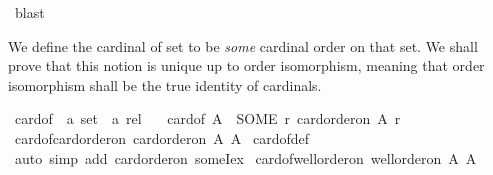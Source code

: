 \begin{isabellebody}
\ blast%
\endisatagproof
{\isafoldproof}%
%
\isadelimproof
%
\endisadelimproof
%
\isadelimdocument
%
\endisadelimdocument
%
\isatagdocument
%
\isamarkuptrue%
%
\endisatagdocument
{\isafolddocument}%
%
\isadelimdocument
%
\endisadelimdocument
%
\begin{isamarkuptext}%
We define the cardinal of set to be {\em some} cardinal order on that set.
We shall prove that this notion is unique up to order isomorphism, meaning
that order isomorphism shall be the true identity of cardinals.%
\end{isamarkuptext}\isamarkuptrue%
\isamarkupfalse%
\ card{\isacharunderscore}{\kern0pt}of\ {\isacharcolon}{\kern0pt}{\isacharcolon}{\kern0pt}\ {\isachardoublequoteopen}{\isacharprime}{\kern0pt}a\ set\ {\isasymRightarrow}\ {\isacharprime}{\kern0pt}a\ rel{\isachardoublequoteclose}\ {\isacharparenleft}{\kern0pt}{\isachardoublequoteopen}{\isacharbar}{\kern0pt}{\isacharunderscore}{\kern0pt}{\isacharbar}{\kern0pt}{\isachardoublequoteclose}\ {\isacharparenright}{\kern0pt}\isanewline
{}\ {\isachardoublequoteopen}card{\isacharunderscore}{\kern0pt}of\ A\ {\isacharequal}{\kern0pt}\ {\isacharparenleft}{\kern0pt}SOME\ r{\isachardot}{\kern0pt}\ card{\isacharunderscore}{\kern0pt}order{\isacharunderscore}{\kern0pt}on\ A\ r{\isacharparenright}{\kern0pt}{\isachardoublequoteclose}\isanewline
\isanewline
{}\isamarkupfalse%
\ card{\isacharunderscore}{\kern0pt}of{\isacharunderscore}{\kern0pt}card{\isacharunderscore}{\kern0pt}order{\isacharunderscore}{\kern0pt}on{\isacharcolon}{\kern0pt}\ {\isachardoublequoteopen}card{\isacharunderscore}{\kern0pt}order{\isacharunderscore}{\kern0pt}on\ A\ {\isacharbar}{\kern0pt}A{\isacharbar}{\kern0pt}{\isachardoublequoteclose}\isanewline
%
\isadelimproof
%
\endisadelimproof
%
\isatagproof
{}\isamarkupfalse%
\ card{\isacharunderscore}{\kern0pt}of{\isacharunderscore}{\kern0pt}def\ \isamarkupfalse%
\ {\isacharparenleft}{\kern0pt}auto\ simp\ add{\isacharcolon}{\kern0pt}\ card{\isacharunderscore}{\kern0pt}order{\isacharunderscore}{\kern0pt}on\ someI{\isacharunderscore}{\kern0pt}ex{\isacharparenright}{\kern0pt}%
\endisatagproof
{\isafoldproof}%
%
\isadelimproof
\isanewline
%
\endisadelimproof
\isanewline
{}\isamarkupfalse%
\ card{\isacharunderscore}{\kern0pt}of{\isacharunderscore}{\kern0pt}well{\isacharunderscore}{\kern0pt}order{\isacharunderscore}{\kern0pt}on{\isacharcolon}{\kern0pt}\ {\isachardoublequoteopen}well{\isacharunderscore}{\kern0pt}order{\isacharunderscore}{\kern0pt}on\ A\ {\isacharbar}{\kern0pt}A{\isacharbar}{\kern0pt}{\isachardoublequoteclose}\isanewline

\end{isabellebody}
